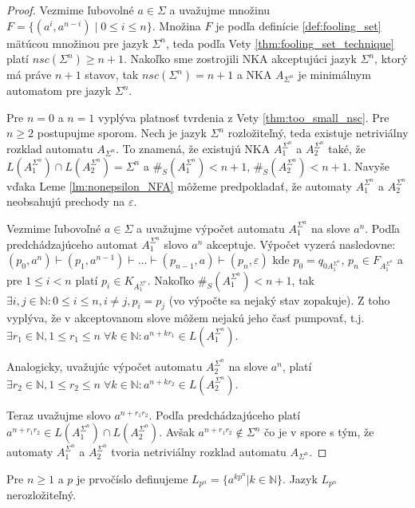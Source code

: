 \begin{proof}
Vezmime ľubovolné $ a \in \Sigma $ a uvažujme množinu $ F = \lbrace (a^i,a^{n-i}) \; | \; 0 \leq i \leq n \rbrace $. Množina $ F $ je podľa definície \ref{def:fooling_set} mätúcou množinou pre jazyk $ \Sigma^n $, teda podľa Vety \ref{thm:fooling_set_technique} platí $ nsc(\Sigma^n) \geq n+1 $. Nakoľko sme zostrojili NKA akceptujúci jazyk $ \Sigma^n $, ktorý má práve $ n+1 $ stavov, tak $ nsc(\Sigma^n) = n+1 $ a NKA $ A_{\Sigma^n} $ je minimálnym automatom pre jazyk $ \Sigma^n $.
\par
Pre $ n=0 $ a $ n=1 $ vyplýva platnosť tvrdenia z Vety \ref{thm:too_small_nsc}. Pre $ n \geq 2 $ postupujme sporom. Nech je jazyk $ \Sigma^n$ rozložiteľný, teda existuje netriviálny rozklad automatu $ A_{\Sigma^n} $. To znamená, že existujú NKA $ A_1^{\Sigma^n} $ a $ A_2^{\Sigma^n} $ také, že $ L(A_1^{\Sigma^n}) \cap L(A_2^{\Sigma^n}) = \Sigma^n $ a $ \#_S(A_1^{\Sigma^n}) < n+1 $, $ \#_S(A_2^{\Sigma^n}) < n+1 $. Navyše vďaka Leme \ref{lm:nonepsilon_NFA} môžeme predpokladať, že automaty $ A_1^{\Sigma^n} $ a $ A_2^{\Sigma^n} $ neobsahujú prechody na $ \varepsilon $. 
\par
Vezmime ľubovoľné $ a \in \Sigma $ a uvažujme výpočet automatu $ A_1^{\Sigma^n} $ na slove $ a^n $. Podľa predchádzajúceho automat $ A_1^{\Sigma^n} $ slovo $ a^n $ akceptuje. Výpočet vyzerá nasledovne: $ (p_0,a^n) \vdash (p_1, a^{n-1}) \vdash \ldots \vdash (p_{n-1}, a) \vdash (p_n, \varepsilon) $ kde $ p_0 = q_{0A_1^{\Sigma^n}}$, $ p_n \in F_{A_1^{\Sigma^n}} $ a pre $ 1 \leq i < n $ platí $ p_i \in K_{A_1^{\Sigma^n}}$. Nakoľko $ \#_S(A_1^{\Sigma^n}) < n+1 $, tak $ \exists i,j \in \mathbb{N}: 0 \leq i \leq n, i \neq j, p_i=p_j $ (vo výpočte sa nejaký stav zopakuje). Z toho vyplýva, že v akceptovanom slove môžem nejakú jeho časť pumpovať, t.j. $ \exists r_1 \in \mathbb{N}, 1 \leq r_1 \leq n \; \forall k \in \mathbb{N}: a^{n + kr_1} \in L(A_1^{\Sigma^n}) $.
\par
Analogicky, uvažujúc výpočet automatu $ A_2^{\Sigma^n} $ na slove $ a^n $, platí $ \exists r_2 \in \mathbb{N}, 1 \leq r_2 \leq n \; \forall k \in \mathbb{N}: a^{n + kr_2} \in L(A_2^{\Sigma^n}) $.
\par
Teraz uvažujme slovo $ a^{n+r_1r_2} $. Podľa predchádzajúceho platí $ a^{n+r_1r_2} \in L(A_1^{\Sigma^n}) \cap L(A_2^{\Sigma^n}) $. Avšak $ a^{n+r_1r_2} \notin \Sigma^n $ čo je v spore s tým, že automaty $ A_1^{\Sigma^n} $ a $ A_2^{\Sigma^n} $ tvoria netriviálny rozklad automatu $ A_{\Sigma^n} $.
\end{proof}

\begin{theorem}
\label{thm:prime^n}
Pre $ n \geq 1 $ a $ p $ je prvočíslo definujeme $ L_{p^n} = \lbrace a^{kp^{n}} | k \in \mathbb{N} \rbrace $. Jazyk $ L_{p^n} $ nerozložiteľný.
\end{theorem}

